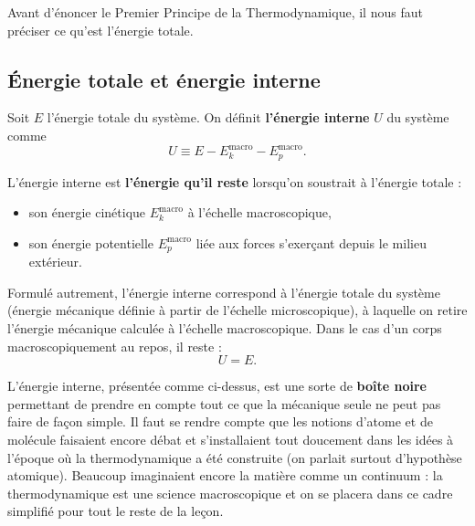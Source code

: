 \documentclass[11pt,a4paper]{report}
\begin{document}
Avant d'énoncer le Premier Principe de la Thermodynamique, il nous faut préciser ce qu'est l'énergie totale.

\subsection{\'Energie totale et énergie interne}

Soit $E$ l'énergie totale du système. On définit \textbf{l'énergie interne} $U$ du système comme
\begin{equation}
	U \equiv E - E_{k}^{\text{macro}} - E_{p}^{\text{macro}}.
\end{equation}

L'énergie interne est \textbf{l'énergie qu'il reste} lorsqu'on soustrait à l'énergie totale :
\begin{itemize}
	\item son énergie cinétique $E_{k}^{\text{macro}}$ à l'échelle macroscopique,
	\item son énergie potentielle $E_{p}^{\text{macro}}$ liée aux forces s'exerçant depuis le milieu extérieur.
\end{itemize}
Formulé autrement, l'énergie interne correspond à l'énergie totale du système (énergie mécanique définie à partir de l'échelle microscopique), à laquelle on retire l'énergie mécanique calculée à l'échelle macroscopique. Dans le cas d'un corps macroscopiquement au repos, il reste :
\begin{equation}
	U = E.
\end{equation}

L'énergie interne, présentée comme ci-dessus, est une sorte de \textbf{boîte noire} permettant de prendre en compte tout ce que la mécanique seule ne peut pas faire de façon simple. Il faut se rendre compte que les notions d'atome et de molécule faisaient encore débat et s'installaient tout doucement dans les idées à l'époque où la thermodynamique a été construite (on parlait surtout d'hypothèse atomique). Beaucoup imaginaient encore la matière comme un continuum : la thermodynamique est une science macroscopique et on se placera dans ce cadre simplifié pour tout le reste de la leçon.\\
\end{document}
